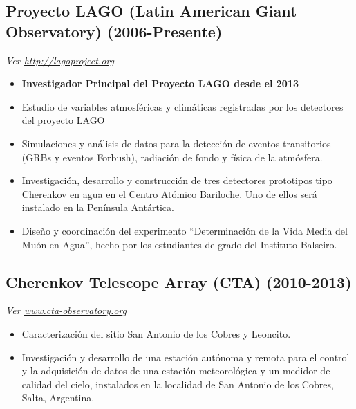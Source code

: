 \subsection*{Proyecto LAGO (Latin American Giant Observatory) (2006-Presente)}
{\small{\textit{Ver \href{http://lagoproject.org}{http://lagoproject.org}}}}\\
\begin{itemize}
  \item {\bf{Investigador Principal del Proyecto LAGO desde el 2013}}
\item Estudio de variables atmosféricas y climáticas registradas por los detectores del proyecto LAGO
\item Simulaciones y análisis de datos para la detección de eventos transitorios (GRBs y eventos Forbush), radiación de fondo y física de la atmósfera.
\item Investigación, desarrollo y construcción de tres detectores prototipos tipo Cherenkov en agua en el Centro Atómico Bariloche. Uno de ellos será instalado en la Península Antártica. 
\item Diseño y coordinación del experimento ``Determinación de la Vida Media del Muón en Agua'', hecho por los estudiantes de grado del Instituto Balseiro.
\end{itemize}

\subsection*{Cherenkov Telescope Array (CTA) (2010-2013)}
{\small{\textit{Ver \href{http://www.cta-observatory.org}{www.cta-observatory.org}}}}
\begin{itemize}
\item Caracterización del sitio San Antonio de los Cobres y Leoncito. %
\item Investigación y desarrollo de una estación autónoma y remota para el control y la adquisición de datos de una estación meteorológica y un medidor de calidad del cielo, instalados en la localidad de San Antonio de los Cobres, Salta, Argentina.
\end{itemize}

